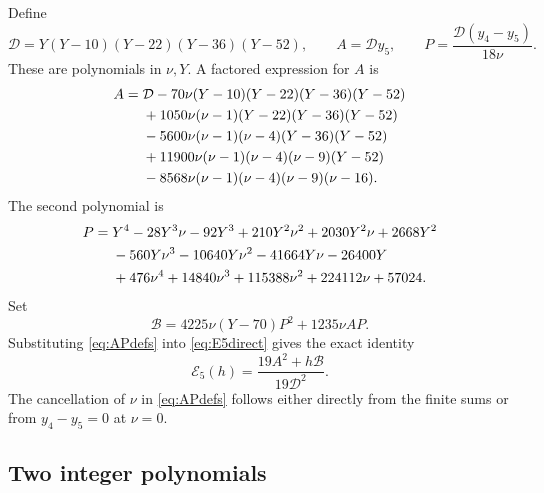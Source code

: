 \documentclass[11pt]{article}
\theoremstyle{remark}
\numberwithin{equation}{section}
\newcommand{\cD}{\mathcal D}
\newcommand{\cB}{\mathcal B}
\begin{document}
Define
\begin{equation}
 \cD=Y(Y-10)(Y-22)(Y-36)(Y-52),\qquad
 A=\cD y_5,\qquad P=\frac{\cD(y_4-y_5)}{18\nu}.
 \label{eq:APdefs}
\end{equation}
These are polynomials in $\nu,Y$. A factored expression for $A$ is
\begin{align}
 A={}&\cD-70\nu(Y-10)(Y-22)(Y-36)(Y-52)\notag\\
 &+1050\nu(\nu-1)(Y-22)(Y-36)(Y-52)\notag\\
 &-5600\nu(\nu-1)(\nu-4)(Y-36)(Y-52)\notag\\
 &+11900\nu(\nu-1)(\nu-4)(\nu-9)(Y-52)\notag\\
 &-8568\nu(\nu-1)(\nu-4)(\nu-9)(\nu-16).
 \label{eq:Aexplicit}
\end{align}
The second polynomial is
\begin{align}
 P={}&Y^4-28Y^3\nu-92Y^3
       +210Y^2\nu^2+2030Y^2\nu+2668Y^2\notag\\
 &-560Y\nu^3-10640Y\nu^2-41664Y\nu-26400Y\notag\\
 &+476\nu^4+14840\nu^3+115388\nu^2+224112\nu+57024.
 \label{eq:Pexplicit}
\end{align}
Set
\begin{equation}
 \cB=4225\nu(Y-70)P^2+1235\nu AP.
 \label{eq:Bexplicit}
\end{equation}
Substituting \eqref{eq:APdefs} into \eqref{eq:E5direct} gives the exact
identity
\begin{equation}
 \mathcal E_5(h)=\frac{19A^2+h\cB}{19\cD^2}.
 \label{eq:E5rational}
\end{equation}
The cancellation of $\nu$ in \eqref{eq:APdefs} follows either directly
from the finite sums or from $y_4-y_5=0$ at $\nu=0$.

\subsection{Two integer polynomials}
\end{document}
